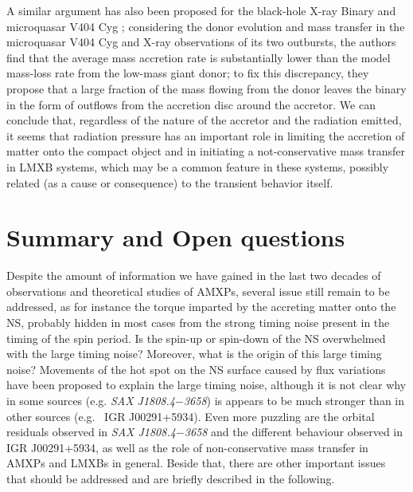 \documentclass[graybox]{svmult}
\def \saxj{{\em SAX J1808.4$-$3658\xspace}}
\begin{document}
A similar argument has also been proposed for the black-hole X-ray Binary and microquasar V404 Cyg  \cite{Ziolkowski2018}; considering the donor evolution and mass transfer in the microquasar V404 Cyg and X-ray observations of its two outbursts, the authors find that the average mass accretion rate is substantially lower than the model mass-loss rate from the low-mass giant donor; to fix this discrepancy, they propose that a large fraction of the mass flowing from the donor leaves the binary in the form of outflows from the accretion disc around the accretor.   
%
We can conclude that, regardless of the nature of the accretor and the radiation emitted, it seems that radiation pressure has an important role in limiting the accretion of matter onto the compact object and in initiating a not-conservative mass transfer in LMXB systems, which may be a common feature in these systems, possibly related (as a cause or consequence) to the transient behavior itself. 


\section{Summary and Open questions}
Despite the amount of information we have gained in the last two decades of observations and theoretical studies of AMXPs, several issue still remain to be addressed, as for instance the torque imparted by the accreting matter onto the NS, probably hidden in most cases from the strong timing noise present in the timing of the spin period. Is the spin-up or spin-down of the NS overwhelmed with the large timing noise? Moreover, what is the origin of this large timing noise? Movements of the hot spot on the NS surface caused by flux variations have been proposed to explain the large timing noise, although it is not clear why in some sources (e.g. \saxj{}) is appears to be much stronger than in other sources (e.g. \ IGR J00291+5934). Even more puzzling are the orbital residuals observed in \saxj{} and the different behaviour observed in IGR J00291+5934, as well as the role of non-conservative mass transfer in AMXPs and LMXBs in general. Beside that, there are other important issues that should be addressed and are briefly described in the following. 
\end{document}
